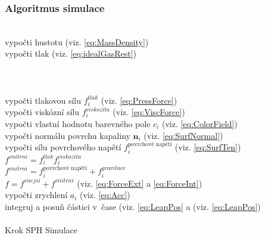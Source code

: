 \newpage

\subsubsection{Algoritmus simulace}

\begin{center}
	\begin{czechalgorithm}[H] \label{alg:SPH}
			 {\\
				vypočti hustotu (viz. \ref{eq:MassDensity})\\
				vypočti tlak (viz. \ref{eq:idealGasRest})\\
			}\\
			\\
			 {\\
				vypočti tlakovou sílu $f^{tlak}_i$ (viz. \ref{eq:PressForce})\\
				vypočti viskózní sílu $f^{viskozita}_i$ (viz. \ref{eq:ViscForce})\\
				vypočti vlastní hodnotu barevného pole $c_i$ (viz. \ref{eq:ColorField})\\
				vypočti normálu povrchu kapaliny $\mathbf{n}_i$ (viz. \ref{eq:SurfNormal})\\
				vypočti sílu povrchového napětí $f^{\text{povrchové napětí}}_i$ (viz. \ref{eq:SurfTen})\\
				$f^{vnitrni} = f^{tlak}_i f^{viskozita}_i$ \\
				$f^{vnitrni} = f^{\text{povrchové napětí}}_i + f^{gravitace}_i$\\
				$f = f^{vnejsi} + f^{vnitrni}$ (viz. \ref{eq:ForceExt} a \ref{eq:ForceInt})\\
				vypočti zrychlení $a_i$ (viz. \ref{eq:Acc})\\
				integruj a posuň částici v~čase (viz. \ref{eq:LeapPos} a (viz. \ref{eq:LeapPos})\\
			}\\

		\caption{Krok SPH Simulace}
	\end{czechalgorithm}
\end{center}


